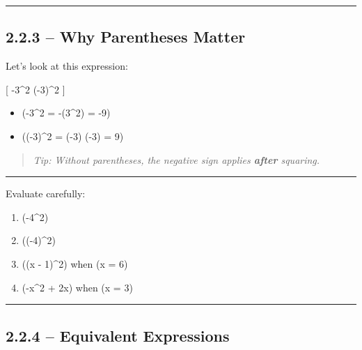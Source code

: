 \documentclass[
  letterpaper,
  DIV=11,
  numbers=noendperiod]{scrreprt}
\providecommand{\tightlist}{%
  \setlength{\itemsep}{0pt}\setlength{\parskip}{0pt}}
\begin{document}
\begin{center}\rule{0.5\linewidth}{0.5pt}\end{center}

\subsection*{2.2.3 -- Why Parentheses
Matter}\label{why-parentheses-matter}

Let's look at this expression:

{[} -3\^{}2 \quad {} \quad (-3)\^{}2 {]}

\begin{itemize}
\tightlist
\item
  (-3\^{}2 = -(3\^{}2) = -9)\\
\item
  ((-3)\^{}2 = (-3) \cdot (-3) = 9)
\end{itemize}

\begin{quote}
\emph{Tip: Without parentheses, the negative sign applies \textbf{after}
squaring.}
\end{quote}

\begin{center}\rule{0.5\linewidth}{0.5pt}\end{center}

Evaluate carefully:

\begin{enumerate}
\def\labelenumi{\arabic{enumi}.}
\tightlist
\item
  (-4\^{}2)\\
\item
  ((-4)\^{}2)\\
\item
  ((x - 1)\^{}2) when (x = 6)\\
\item
  (-x\^{}2 + 2x) when (x = 3)
\end{enumerate}

\begin{center}\rule{0.5\linewidth}{0.5pt}\end{center}

\subsection*{2.2.4 -- Equivalent
Expressions}\label{equivalent-expressions}
\end{document}
